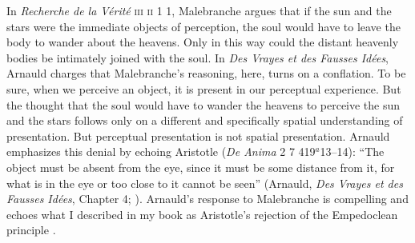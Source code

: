 \documentclass[12pt]{article}
\begin{document}
In \emph{Recherche de la Vérité} \textsc{iii} \textsc{ii} 1 1, Malebranche argues that if the sun and the stars were the immediate objects of perception, the soul would have to leave the body to wander about the heavens. Only in this way could the distant heavenly bodies be intimately joined with the soul. In \emph{Des Vrayes et des Fausses Idées}, Arnauld charges that Malebranche’s reasoning, here, turns on a conflation. To be sure, when we perceive an object, it is present in our perceptual experience. But the thought that the soul would have to wander the heavens to perceive the sun and the stars follows only on a different and specifically spatial understanding of presentation. But perceptual presentation is not spatial presentation. Arnauld emphasizes this denial by echoing Aristotle (\emph{De Anima} 2 7 419\( ^{a} \)13--14): ``The object must be absent from the eye, since it must be some distance from it, for what is in the eye or too close to it cannot be seen'' (Arnauld, \emph{Des Vrayes et des Fausses Idées}, Chapter 4; \citealt[62]{Gaukroger:1990rz}). Arnauld's response to Malebranche is compelling and echoes what I described in my book as Aristotle’s rejection of the Empedoclean principle \citep[chapter 2]{Kalderon:2015fr}. 


\end{document}
